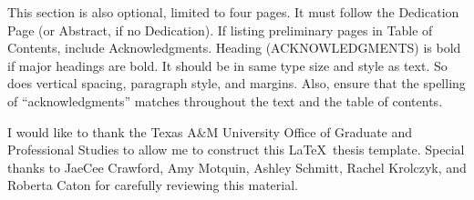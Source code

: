 
\begin{acknowledgements}

This section is also optional, limited to four pages. It must follow the Dedication Page (or Abstract, if no Dedication). If listing preliminary pages in Table of Contents, include Acknowledgments. Heading (\MakeUppercase{Acknowledgments}) is bold if major headings are bold. It should be in same type size and style as text. So does vertical spacing, paragraph style, and margins. Also, ensure that the spelling of ``acknowledgments'' matches throughout the text and the table of contents.

I would like to thank the Texas A\&M University Office of Graduate and Professional Studies to allow me to construct this \LaTeX\ thesis template. Special thanks to JaeCee Crawford, Amy Motquin, Ashley Schmitt, Rachel Krolczyk, and Roberta Caton for carefully reviewing this material.  %


\end{acknowledgements}